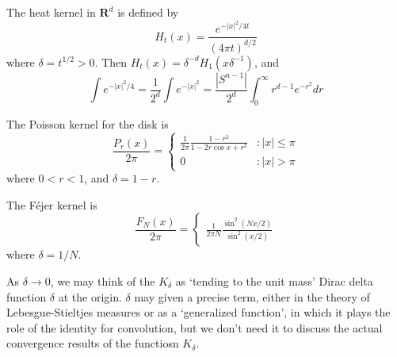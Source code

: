 \begin{example}
    The heat kernel in $\mathbf{R}^d$ is defined by
    \[ H_t(x) = \frac{e^{-|x|^2/4t}}{(4 \pi t)^{d/2}} \]
    where $\delta = t^{1/2} > 0$. Then $H_t(x) = \delta^{-d} H_1(x\delta^{-1})$, and
    \[ \int e^{-|x|^2/4} = \frac{1}{2^d} \int e^{-|x|^2} = \frac{|S^{n-1}|}{2^d} \int_0^\infty r^{d-1} e^{-r^2} dr \]
\end{example}

\begin{example}
    The Poisson kernel for the disk is
    \[ \frac{P_r(x)}{2 \pi} = \begin{cases} \frac{1}{2\pi} \frac{1 - r^2}{1 - 2r \cos x + r^2} &: |x| \leq \pi \\ 0 &: |x| > \pi \end{cases} \]
    where $0 < r < 1$, and $\delta = 1-r$.
\end{example}

\begin{example}
    The F\'{e}jer kernel is
    \[ \frac{F_N(x)}{2 \pi} = \begin{cases} \frac{1}{2 \pi N} \frac{\sin^2(Nx/2)}{\sin^2(x/2)} \end{cases} \]
    where $\delta = 1/N$.
\end{example}

As $\delta \to 0$, we may think of the $K_\delta$ as `tending to the unit mass' Dirac delta function $\delta$ at the origin. $\delta$ may given a precise term, either in the theory of Lebesgue-Stieltjes measures or as a `generalized function', in which it plays the role of the identity for convolution, but we don't need it to discuss the actual convergence results of the functiosn $K_\delta$.

